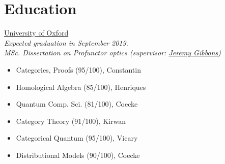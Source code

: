 \documentclass[nocolors]{friggeri-cv-a4}
\begin{document}
\section{Education}

\begin{entrylist}


  {}
  {\href{https://www.ox.ac.uk/admissions/graduate/courses/msc-mathematics-and-foundations-computer-science?wssl=1}
    {\normalsize{University of Oxford}} \\ \emph{Expected graduation in September 2019. \\ MSc. Dissertation on Profunctor optics (supervisor: \href{https://www.cs.ox.ac.uk/people/jeremy.gibbons/}{Jeremy Gibbons})} {\scriptsize
    \begin{multicols}{2}
      \begin{itemize}[topsep=0pt]
      \item Categories, Proofs (95/100), Constantin
      \item Homological Algebra (85/100), Henriques
      \item Quantum Comp. Sci. (81/100), Coecke
      \item Category Theory (91/100), Kirwan
      \item Categorical Quantum (95/100), Vicary
      \item Distributional Models (90/100), Coecke
      \end{itemize}
    \end{multicols}
  }}
  

\end{entrylist}
\end{document}
